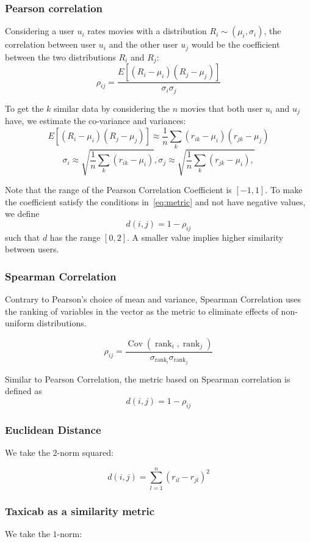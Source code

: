 \documentclass[final]{cvpr}
\begin{document}
\subsubsection{Pearson correlation}
Considering a user $u_i$ rates movies with a distribution $R_i \sim (\mu_i,\sigma_i)$,
the correlation between user $u_i$ and the other user $u_j$
would be the coefficient between the two distributions $R_i$ and $R_j$:
$$ \rho_{ij} = \frac{E[(R_i - \mu_i)(R_j - \mu_j)]}{\sigma_i \sigma_j} $$

To get the $k$ similar data by considering the $n$ movies that both user $u_i$ and $u_j$ have, we estimate the co-variance and variances:
$$ E[(R_i-\mu_i)(R_j-\mu_j)] \approx \frac{1}{n} \sum_k (r_{ik} - \mu_i) (r_{jk} - \mu_j)$$
$$ \sigma_i \approx \sqrt{\frac{1}{n} \sum_k (r_{ik} - \mu_i)} ,
 \sigma_j \approx \sqrt{\frac{1}{n} \sum_k (r_{jk} - \mu_i) ,}$$

Note that the range of the Pearson Correlation Coefficient is $[-1,1]$.
To make the coefficient satisfy the conditions in~\ref{eq:metric}
and not have negative values, we define $$ d(i, j) = 1 - \rho_{ij} $$
such that $d$ has the range $[0, 2]$.
A smaller value implies higher similarity between users.

\subsubsection{Spearman Correlation}
Contrary to Pearson's choice of mean and variance,
Spearman Correlation uses the ranking of variables in the vector as the metric
to eliminate effects of non-uniform distributions.

$$ \rho_{ij} = \frac{
	\operatorname{Cov}({\operatorname{rank}_i, \operatorname{rank}_j})
}{
	\sigma_{\operatorname{rank}_i} \sigma_{\operatorname{rank}_j}
} $$

Similar to Pearson Correlation, the metric based on Spearman correlation is defined as
$$ d(i, j) = 1 - \rho_{ij} $$

\subsubsection{Euclidean Distance}
We take the $2$-norm squared:

$$ d(i, j) = \sum_{l=1}^n \left( r_{il} - r_{jl} \right)^2 $$

\subsubsection{Taxicab as a similarity metric}
We take the $1$-norm:
\end{document}
